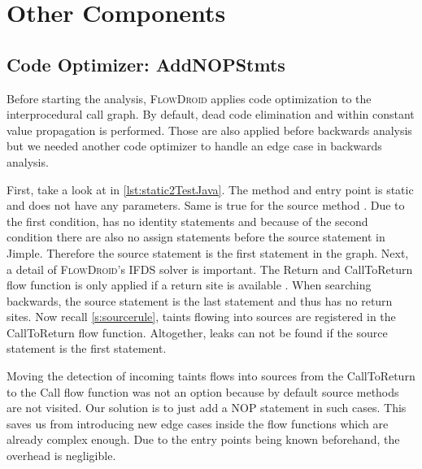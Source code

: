 \documentclass[../draft.tex]{subfiles}
\begin{document}
    \section{Other Components}
    \subsection{Code Optimizer: AddNOPStmts}
    Before starting the analysis, \textsc{FlowDroid} applies code optimization to the interprocedural call graph. By default, dead code elimination and within constant value propagation is performed. Those are also applied before backwards analysis but we needed another code optimizer to handle an edge case in backwards analysis.

    First, take a look at  in \autoref{lst:static2TestJava}. The method and entry point  is static and does not have any parameters. Same is true for the source method . Due to the first condition,  has no identity statements and because of the second  condition there are also no assign statements before the source statement in Jimple. Therefore the source statement is the first statement in the graph. 
    Next, a detail of \textsc{FlowDroid}'s IFDS solver is important. The Return and CallToReturn flow function is only applied if a return site is available \cite{Arzt2017PhD}.
    When searching backwards, the source statement is the last statement and thus has no return sites. Now recall \autoref{s:sourcerule}, taints flowing into sources are registered in the CallToReturn flow function. Altogether, leaks can not be found if the source statement is the first statement.

    Moving the detection of incoming taints flows into sources from the CallToReturn to the Call flow function was not an option because by default source methods are not visited. 
    Our solution is to just add a NOP statement in such cases. This saves us from introducing new edge cases inside the flow functions which are already complex enough. Due to the entry points being known beforehand, the overhead is negligible.
\end{document}
